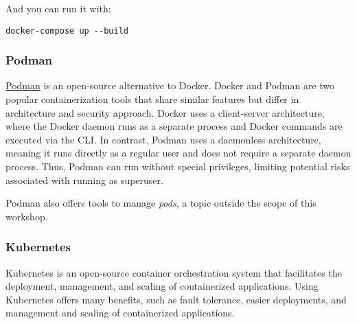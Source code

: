 \documentclass[french]{article}
\begin{document}
And you can run it with:

\begin{lstlisting}
docker-compose up --build
\end{lstlisting}

\subsubsection{Podman}

\href{https://podman.io/}{Podman} is an open-source alternative to Docker.
Docker and Podman are two popular containerization tools that share similar features but differ in architecture and security approach.
Docker uses a client-server architecture, where the Docker daemon runs as a separate process and Docker commands are executed via the CLI.
In contrast, Podman uses a daemonless architecture, meaning it runs directly as a regular user and does not require a separate daemon process.
Thus, Podman can run without special privileges, limiting potential risks associated with running as superuser. \cite{redhat2022podman}

Podman also offers tools to manage \textit{pods}, a topic outside the scope of this workshop.

\subsubsection{Kubernetes}

Kubernetes is an open-source container orchestration system that facilitates the deployment, management, and scaling of containerized applications.
Using Kubernetes offers many benefits, such as fault tolerance, easier deployments, and management and scaling of containerized applications.

\newpage
\nocite{*}


\end{document}
